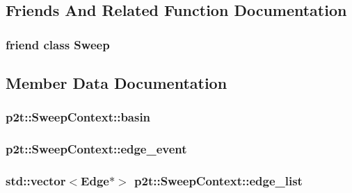 \subsection{Friends And Related Function Documentation}
\hypertarget{classp2t_1_1_sweep_context_a908f328c298fc585c89c0ab14546aeba}{}
\subsubsection[{Sweep}]{\setlength{\rightskip}{0pt plus 5cm}friend class {\bf Sweep}\hspace{0.3cm}{\ttfamily [friend]}}\label{classp2t_1_1_sweep_context_a908f328c298fc585c89c0ab14546aeba}


\subsection{Member Data Documentation}
\hypertarget{classp2t_1_1_sweep_context_a79c599f974533a926b6a9ec73870e7d4}{}
\subsubsection[{basin}]{ p2t\+::\+Sweep\+Context\+::basin}\label{classp2t_1_1_sweep_context_a79c599f974533a926b6a9ec73870e7d4}
\hypertarget{classp2t_1_1_sweep_context_a86a138afe29697cfcd33158ec59c663e}{}
\subsubsection[{edge\+\_\+event}]{ p2t\+::\+Sweep\+Context\+::edge\+\_\+event}\label{classp2t_1_1_sweep_context_a86a138afe29697cfcd33158ec59c663e}
\hypertarget{classp2t_1_1_sweep_context_ab5da3232dd8284254ecdedbec3047ea0}{}
\subsubsection[{edge\+\_\+list}]{\setlength{\rightskip}{0pt plus 5cm}std\+::vector$<${\bf Edge}$\ast$$>$ p2t\+::\+Sweep\+Context\+::edge\+\_\+list}\label{classp2t_1_1_sweep_context_ab5da3232dd8284254ecdedbec3047ea0}


